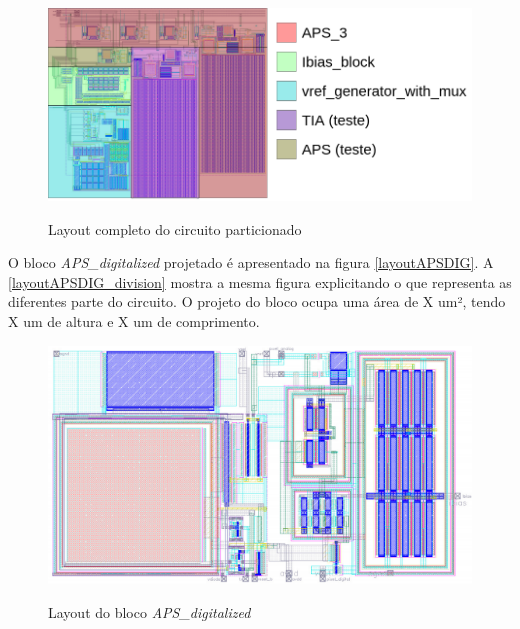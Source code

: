 \begin{figure}[htb]
 \centering
    \caption{Layout completo do circuito particionado} 
    \includegraphics[scale=0.3]{Resultados/Imagens/Image_CircuitoCompleto.png}
    \label{layoutcompleto_division}
\end{figure}

O bloco \textit{APS\_digitalized} projetado é apresentado na figura \autoref{layoutAPSDIG}. A \autoref{layoutAPSDIG_division} mostra a mesma figura explicitando o que representa as diferentes parte do circuito. O projeto do bloco ocupa uma área de X um², tendo X um de altura e X um de comprimento.

\begin{figure}[htb]
 \centering
    \centering
    \caption{Layout do bloco \textit{APS\_digitalized}} 
    \includegraphics[scale=0.8]{Resultados/Imagens/APS_DIGITALIZED.png}
    \label{layoutAPSDIG}
\end{figure}

